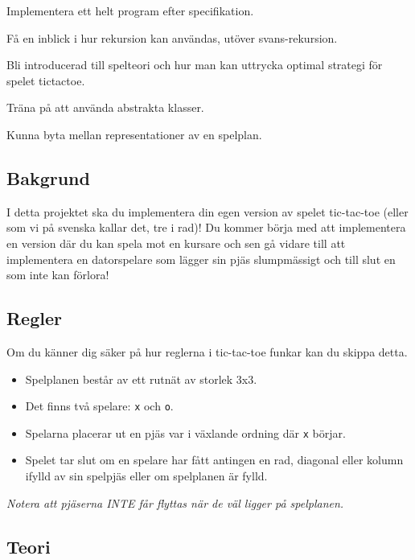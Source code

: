 

\begin{Goals}
	\item Implementera ett helt program efter specifikation.
	\item Få en inblick i hur rekursion kan användas, utöver svans-rekursion.
	\item Bli introducerad till spelteori och hur man kan uttrycka optimal strategi för spelet tictactoe.
	\item Träna på att använda abstrakta klasser.
	\item Kunna byta mellan representationer av en spelplan.
\end{Goals}

\subsection{Bakgrund}
I detta projektet ska du implementera din egen version av spelet tic-tac-toe (eller som vi på svenska kallar det, tre i rad)! Du kommer börja med att implementera en version där du kan spela mot en kursare och sen gå vidare till att implementera en datorspelare som lägger sin pjäs slumpmässigt och till slut en som inte kan förlora!


\subsection{Regler}
Om du känner dig säker på hur reglerna i tic-tac-toe funkar kan du skippa detta. 
\begin{itemize}
	\item Spelplanen består av ett rutnät av storlek 3x3.
	\item Det finns två spelare: \texttt{x} och \texttt{o}.
	\item Spelarna placerar ut en pjäs var i växlande ordning där \texttt{x} börjar.
	\item Spelet tar slut om en spelare har fått antingen en rad, diagonal eller kolumn ifylld av sin spelpjäs eller om spelplanen är fylld.
\end{itemize}
\textit{Notera att pjäserna INTE får flyttas när de väl ligger på spelplanen.}

\subsection{Teori}

